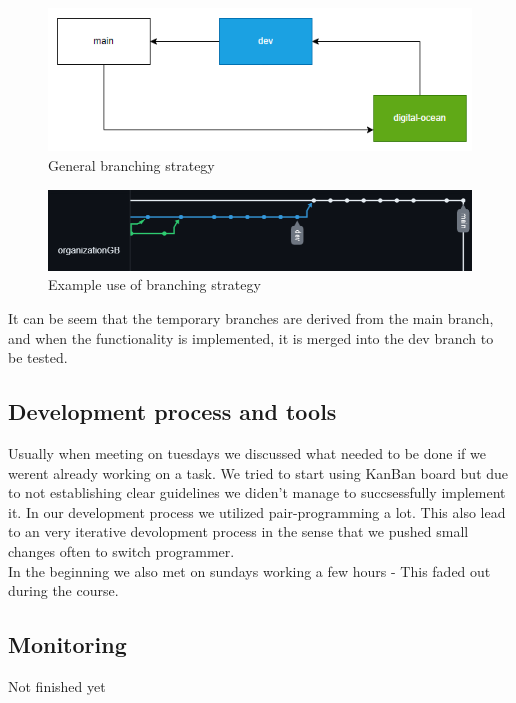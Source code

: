 \begin{figure}[H]
    \centering
    \captionsetup{justification=centering,margin=1cm}
    \includegraphics[width=0.7\linewidth]{report/images/branching.png}
    \caption{General branching strategy}
    \label{fig:gen_branch}
\end{figure}

\begin{figure}[H]
    \centering
    \captionsetup{justification=centering,margin=1cm}
    \includegraphics[width=0.7\linewidth]{report/images/git_branching.png}
    \caption{Example use of branching strategy}
    \label{fig:ex_branch}
\end{figure}

It can be seem that the temporary branches are derived from the main branch, and when the functionality is implemented, 
it is merged into the dev branch to be tested. 

\subsection{Development process and tools}
Usually when meeting on tuesdays we discussed what needed to be done if we werent already working on a task. We tried to start using KanBan board but due to not establishing 
clear guidelines we diden't manage to succsessfully implement it. In our development process we utilized pair-programming a lot. This also lead to an very iterative devolopment 
process in the sense that we pushed small changes often to switch programmer.\\

In the beginning we also met on sundays working a few hours - This faded out during the course.

\subsection{Monitoring}
Not finished yet

